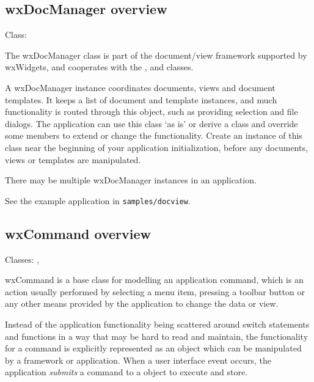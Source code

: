 \subsection{wxDocManager overview}\label{wxdocmanageroverview}


Class: 

The wxDocManager class is part of the document/view framework supported by wxWidgets,
and cooperates with the , \rtfsp
and  classes.

A wxDocManager instance coordinates documents, views and document templates. It keeps a list of document
and template instances, and much functionality is routed through this object, such
as providing selection and file dialogs. The application can use this class `as is' or
derive a class and override some members to extend or change the functionality.
Create an instance of this class near the beginning of your application initialization,
before any documents, views or templates are manipulated.

There may be multiple wxDocManager instances in an application.

See the example application in {\tt samples/docview}.

\subsection{wxCommand overview}\label{wxcommandoverview}


Classes: , 

wxCommand is a base class for modelling an application command,
which is an action usually performed by selecting a menu item, pressing
a toolbar button or any other means provided by the application to
change the data or view.

Instead of the application functionality being scattered around
switch statements and functions in a way that may be hard to
read and maintain, the functionality for a command is explicitly represented
as an object which can be manipulated by a framework or application.
When a user interface event occurs, the application {\it submits} a command
to a  object to execute and
store.

